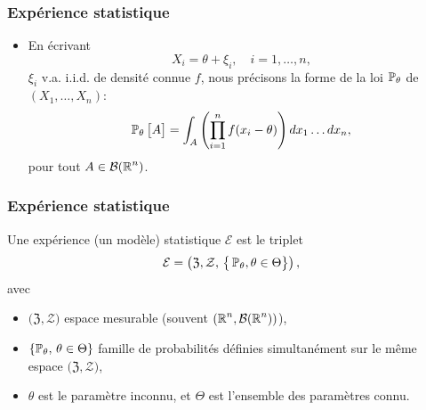 \begin{frame}
\frametitle{Expérience statistique}
\begin{itemize}
\item En \'ecrivant
$$ X_i= \theta +\xi_i, \quad i=1,\dots,n,$$
$\xi_i$ v.a. i.i.d. de densit\'e \alert{ connue} $f$, nous
pr\'ecisons la forme de la loi $\operatorname{{\mathbb P}}_{\theta}$ de
$(X_1,\dots,X_n)$:
$$\operatorname{{\mathbb P}}_\theta\big[A\big] = \int_A
\left(\prod_{i=1}^n f(x_i-\theta)\right) dx_1\ldots dx_n,
$$
pour tout $A\in {\mathcal B}(\operatorname{{\mathbb R}}^n)$.
\end{itemize}
\end{frame}


\begin{frame}
\frametitle{Expérience statistique}
\begin{df}
Une expérience (un modèle) statistique ${\mathcal E}$ est le triplet
$${\mathcal E} = \left(\mathfrak{Z}, {\mathcal Z}, \,\big\{\operatorname{{\mathbb P}}_\theta, \theta \in \Theta\big\}\right),$$
avec
\begin{itemize}
\item $\big(\mathfrak{Z}, {\mathcal Z}\big)$ espace mesurable (souvent
$(\operatorname{{\mathbb R}}^n,{\mathcal B}(\operatorname{{\mathbb R}}^n))$),
\item $\{\operatorname{{\mathbb P}}_\theta,\,\theta \in \Theta\}$ famille de probabilités définies \alert{simultanément} sur le même espace  $\big(\mathfrak{Z}, {\mathcal Z}\big)$,
\item $\theta$ est le \alert{paramètre inconnu}, et $\Theta$ est \alert{ l'ensemble des paramètres connu}.
\end{itemize}
\end{df}
\end{frame}




